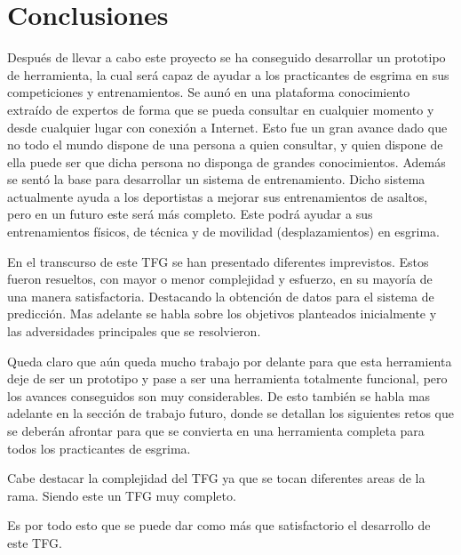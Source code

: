 \chapter{Conclusiones}
\label{cap:Conclusiones}



Después de llevar a cabo este proyecto se ha conseguido desarrollar un prototipo de herramienta,
la cual será capaz de ayudar a los practicantes de esgrima en sus competiciones y entrenamientos.
Se aunó en una plataforma conocimiento extraído de expertos de forma que se pueda consultar
en cualquier momento y desde cualquier lugar con conexión a Internet. Esto fue un gran avance
dado que no todo el mundo dispone de una persona a quien consultar, y quien dispone de ella
puede ser que dicha persona no disponga de grandes conocimientos. Además se sentó la base para
desarrollar un sistema de entrenamiento. Dicho sistema actualmente ayuda a los deportistas
a mejorar sus entrenamientos de asaltos, pero en un futuro este será más completo. Este podrá
ayudar a sus entrenamientos físicos, de técnica y de movilidad (desplazamientos) en esgrima.

En el transcurso de este TFG se han presentado diferentes imprevistos. Estos fueron resueltos,
con mayor o menor complejidad y esfuerzo, en su mayoría de una manera satisfactoria. Destacando
la obtención de datos para el sistema de predicción. Mas adelante
se habla sobre los objetivos planteados inicialmente y las adversidades principales que se resolvieron.

Queda claro que aún queda mucho trabajo por delante para que esta herramienta deje de ser un prototipo
y pase a ser una herramienta totalmente funcional, pero los avances conseguidos son muy considerables.
De esto también se habla mas adelante en la sección de trabajo futuro, donde se detallan los siguientes
retos que se deberán afrontar para que se convierta en una herramienta completa para todos los practicantes
de esgrima.

Cabe destacar la complejidad del TFG ya que se tocan diferentes areas de la rama. Siendo este un TFG
muy completo.

Es por todo esto que se puede dar como más que satisfactorio el desarrollo de este TFG.




